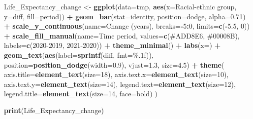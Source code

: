 \documentclass[
]{article}
\newenvironment{Shaded}{\begin{snugshade}}{\end{snugshade}}
\newcommand{\AttributeTok}[1]{\textcolor[rgb]{0.13,0.29,0.53}{#1}}
\newcommand{\DecValTok}[1]{\textcolor[rgb]{0.00,0.00,0.81}{#1}}
\newcommand{\FloatTok}[1]{\textcolor[rgb]{0.00,0.00,0.81}{#1}}
\newcommand{\FunctionTok}[1]{\textcolor[rgb]{0.13,0.29,0.53}{\textbf{#1}}}
\newcommand{\NormalTok}[1]{#1}
\newcommand{\OtherTok}[1]{\textcolor[rgb]{0.56,0.35,0.01}{#1}}
\newcommand{\SpecialCharTok}[1]{\textcolor[rgb]{0.81,0.36,0.00}{\textbf{#1}}}
\newcommand{\StringTok}[1]{\textcolor[rgb]{0.31,0.60,0.02}{#1}}
\begin{document}
\begin{Shaded}
\begin{Highlighting}[]
\NormalTok{Life\_Expectancy\_change }\OtherTok{\textless{}{-}} \FunctionTok{ggplot}\NormalTok{(}\AttributeTok{data=}\NormalTok{tmp, }\FunctionTok{aes}\NormalTok{(}\AttributeTok{x=}\StringTok{\textasciigrave{}}\AttributeTok{Racial{-}ethnic group}\StringTok{\textasciigrave{}}\NormalTok{, }\AttributeTok{y=}\NormalTok{diff, }\AttributeTok{fill=}\NormalTok{period)) }\SpecialCharTok{+}
  \FunctionTok{geom\_bar}\NormalTok{(}\AttributeTok{stat=}\StringTok{\textquotesingle{}identity\textquotesingle{}}\NormalTok{, }\AttributeTok{position=}\StringTok{\textquotesingle{}dodge\textquotesingle{}}\NormalTok{, }\AttributeTok{alpha=}\FloatTok{0.71}\NormalTok{) }\SpecialCharTok{+}
  \FunctionTok{scale\_y\_continuous}\NormalTok{(}\AttributeTok{name=}\StringTok{\textquotesingle{}Change (years)\textquotesingle{}}\NormalTok{, }\AttributeTok{breaks=}\SpecialCharTok{{-}}\DecValTok{5}\SpecialCharTok{:}\DecValTok{0}\NormalTok{, }\AttributeTok{limits=}\FunctionTok{c}\NormalTok{(}\SpecialCharTok{{-}}\FloatTok{5.5}\NormalTok{, }\DecValTok{0}\NormalTok{)) }\SpecialCharTok{+}
  \FunctionTok{scale\_fill\_manual}\NormalTok{(}\AttributeTok{name=}\StringTok{\textquotesingle{}Time period\textquotesingle{}}\NormalTok{, }\AttributeTok{values=}\FunctionTok{c}\NormalTok{(}\StringTok{\textquotesingle{}\#ADD8E6\textquotesingle{}}\NormalTok{, }\StringTok{\textquotesingle{}\#00008B\textquotesingle{}}\NormalTok{), }\AttributeTok{labels=}\FunctionTok{c}\NormalTok{(}\StringTok{\textquotesingle{}2020{-}2019\textquotesingle{}}\NormalTok{, }\StringTok{\textquotesingle{}2021{-}2020\textquotesingle{}}\NormalTok{)) }\SpecialCharTok{+} 
  \FunctionTok{theme\_minimal}\NormalTok{() }\SpecialCharTok{+} \FunctionTok{labs}\NormalTok{(}\AttributeTok{x=}\StringTok{\textquotesingle{}\textquotesingle{}}\NormalTok{) }\SpecialCharTok{+}
  \FunctionTok{geom\_text}\NormalTok{(}\FunctionTok{aes}\NormalTok{(}\AttributeTok{label=}\FunctionTok{sprintf}\NormalTok{(diff, }\AttributeTok{fmt=}\StringTok{\textquotesingle{}\%.1f\textquotesingle{}}\NormalTok{)), }\AttributeTok{position=}\FunctionTok{position\_dodge}\NormalTok{(}\AttributeTok{width=}\FloatTok{0.9}\NormalTok{), }\AttributeTok{vjust=}\FloatTok{1.3}\NormalTok{, }\AttributeTok{size=}\FloatTok{4.5}\NormalTok{) }\SpecialCharTok{+} 
  \FunctionTok{theme}\NormalTok{(}
    \AttributeTok{axis.title=}\FunctionTok{element\_text}\NormalTok{(}\AttributeTok{size=}\DecValTok{18}\NormalTok{), }
    \AttributeTok{axis.text.x=}\FunctionTok{element\_text}\NormalTok{(}\AttributeTok{size=}\DecValTok{10}\NormalTok{), }
    \AttributeTok{axis.text.y=}\FunctionTok{element\_text}\NormalTok{(}\AttributeTok{size=}\DecValTok{14}\NormalTok{),}
    \AttributeTok{legend.text=}\FunctionTok{element\_text}\NormalTok{(}\AttributeTok{size=}\DecValTok{12}\NormalTok{), }
    \AttributeTok{legend.title=}\FunctionTok{element\_text}\NormalTok{(}\AttributeTok{size=}\DecValTok{14}\NormalTok{, }\AttributeTok{face=}\StringTok{\textquotesingle{}bold\textquotesingle{}}\NormalTok{)}
\NormalTok{  )}

\FunctionTok{print}\NormalTok{(Life\_Expectancy\_change)}
\end{Highlighting}
\end{Shaded}
\end{document}
